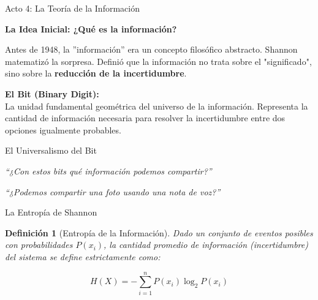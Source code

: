\documentclass[10pt, aspectratio=169]{beamer}
\newtheorem{definicion}{Definición}
\begin{document}
\begin{frame}{Acto 4: La Teoría de la Información}
    \vspace{0.6cm}
    \begin{center}
        \Large \textbf{La Idea Inicial: ¿Qué es la información?}
        
        \vspace{0.8cm}
        \normalsize
        Antes de 1948, la ''información'' era un concepto filosófico abstracto. Shannon matematizó la sorpresa. Definió que la información no trata sobre el "significado", sino sobre la \textbf{reducción de la incertidumbre}.
        
        \vspace{0.6cm}
        \alert{\textbf{El Bit (Binary Digit):}} \\
        La unidad fundamental geométrica del universo de la información. Representa la cantidad de información necesaria para resolver la incertidumbre entre dos opciones igualmente probables.
    \end{center}
\end{frame}

\begin{frame}{El Universalismo del Bit}
    \vspace{0.8cm}
    \begin{center}
        \huge \textit{``¿Con estos bits qué información podemos compartir?''}
        
        \vspace{0.8cm}
        \huge \alert{\textit{``¿Podemos compartir una foto usando una nota de voz?''}}
    \end{center}
    
\end{frame}

\begin{frame}{La Entropía de Shannon}
    \vspace{0.4cm}
    
    \begin{definicion}[Entropía de la Información]
        Dado un conjunto de eventos posibles con probabilidades $P(x_i)$, la cantidad promedio de información (incertidumbre) del sistema se define estrictamente como:
        
        \vspace{0.2cm}
        \huge
        $$H(X) = - \sum_{i=1}^n P(x_i) \log_2 P(x_i)$$
    \end{definicion}
\end{frame}
\end{document}
